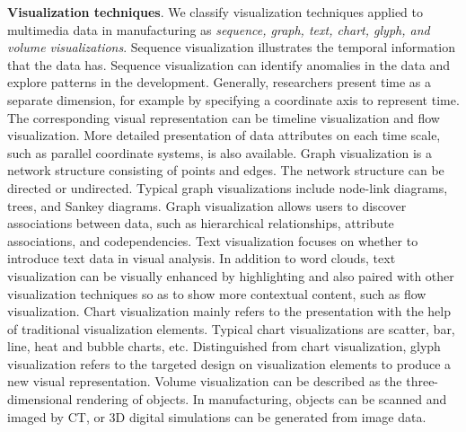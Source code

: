 \documentclass[a4paper,fleqn]{cas-dc}
\begin{document}
\textbf{Visualization techniques}. We classify visualization techniques applied to multimedia data in manufacturing as \textit{sequence, graph, text, chart, glyph, and volume visualizations}. 
Sequence visualization illustrates the temporal information that the data has. Sequence visualization can identify anomalies in the data and explore patterns in the development. Generally, researchers present time as a separate dimension, for example by specifying a coordinate axis to represent time. The corresponding visual representation can be timeline visualization and flow visualization. More detailed presentation of data attributes on each time scale, such as parallel coordinate systems, is also available.
Graph visualization is a network structure consisting of points and edges. The network structure can be directed or undirected. Typical  graph visualizations include node-link diagrams, trees, and Sankey diagrams. Graph visualization allows users to discover associations between data, such as hierarchical relationships, attribute associations, and codependencies.
Text visualization focuses on whether to introduce text data in visual analysis. In addition to word clouds, text visualization can be visually enhanced by highlighting and also paired with other visualization techniques so as to show more contextual content, such as flow visualization.
Chart visualization mainly refers to the presentation with the help of traditional visualization elements. Typical chart visualizations are scatter, bar, line, heat and bubble charts, etc.
Distinguished from chart visualization, glyph visualization refers to the targeted design on visualization elements to produce a new visual representation.
Volume visualization can be described as the three-dimensional rendering of objects. In manufacturing, objects can be scanned and imaged by CT, or 3D digital simulations can be generated from image data.
\end{document}
